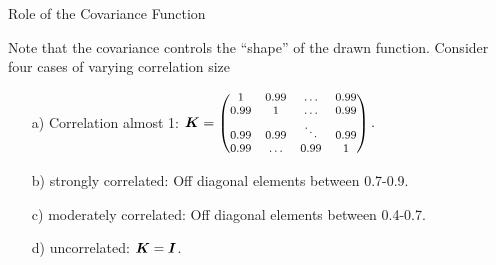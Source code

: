 \documentclass[11pt,compress,t,notes=noshow, xcolor=table]{beamer}
\begin{document}
\begin{vbframe}{Role of the Covariance Function}

Note that the covariance controls the \enquote{shape} of the drawn function. Consider four cases of varying correlation size
\vspace{10pt}

\begin{enumerate}
  \item[a)] Correlation almost 1: $\bm{K} = \begin{footnotesize}\begin{pmatrix} 1 & 0.99 & \dots & 0.99 \\
  0.99 & 1 & \dots & 0.99 \\
  0.99 & 0.99 & \ddots & 0.99 \\
  0.99 & \dots & 0.99 & 1 \end{pmatrix}.\end{footnotesize}$
  \vspace{10pt}
  \item[b)] strongly correlated: Off diagonal elements between 0.7-0.9.
  \vspace{10pt}
  \item[c)] moderately correlated: Off diagonal elements between 0.4-0.7.
  \vspace{10pt}
  \item[d)] uncorrelated: $\bm{K} = \boldsymbol{I}$.
\end{enumerate}

\end{vbframe}
\end{document}
